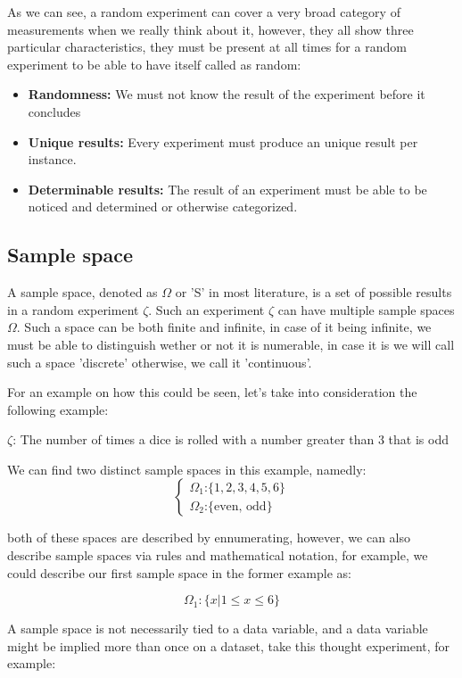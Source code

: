 \documentclass[11pt,fleqn]{book} %
\begin{document}
As we can see, a random experiment can cover a very broad category of measurements when we really think about it, however,
they all show three particular characteristics, they must be present at all times for a random experiment to be able to 
have itself called as random:

\begin{itemize}
    \item \textbf{Randomness: }We must not know the result of the experiment before it concludes
    \item \textbf{Unique results: }Every experiment must produce an unique result per instance.
    \item \textbf{Determinable results: }The result of an experiment must be able to be noticed and determined or otherwise categorized.
\end{itemize}

\subsection{Sample space}

A sample space, denoted as $ \Omega  $ or 'S' in most literature, is a set of possible results in a random experiment 
$ \zeta $. Such an experiment $ \zeta $ can have multiple sample spaces $ \Omega $. Such a space can be both finite and infinite,
in case of it being infinite, we must be able to distinguish wether or not it is numerable, in case it is we will
call such a space 'discrete' otherwise, we call it 'continuous'.

For an example on how this could be seen, let's take into consideration the following example:

$ \zeta $: The number of times a dice is rolled with a number greater than 3 that is odd

We can find two distinct sample spaces in this example, namedly:
$$
\begin{cases}
    \Omega_1 \text{:} \{ 1,2,3,4,5,6 \} \\
    \Omega_2 \text{:} \{ \text{even, odd} \}    
\end{cases}
$$

both of these spaces are described by ennumerating, however, we can also describe sample spaces via rules and mathematical notation,
for example, we could describe our first sample space in the former example as:

$$ \Omega_1: \{ x | 1 \le x \le 6 \} $$

A sample space is not necessarily tied to a data variable, and a data variable might be implied more than once on a dataset,
take this thought experiment, for example:
\end{document}
